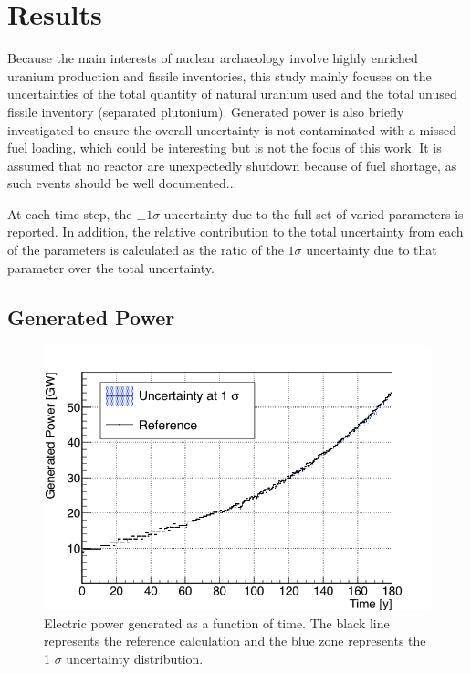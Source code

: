 \documentclass{anstrans}
\begin{document}
\section{Results}

Because the main interests of nuclear archaeology involve highly enriched uranium production and
fissile inventories, this study mainly focuses on the uncertainties of
the total quantity of natural uranium used and the total unused fissile
inventory (separated plutonium).
Generated power is also briefly investigated to ensure the overall
uncertainty is not contaminated with a missed fuel loading, which could
be interesting but is not the focus of this work. It is assumed that no reactor
are unexpectedly shutdown because of fuel shortage, as such events should be well
documented...

At each time step, the $\pm1\sigma$ uncertainty due to the full set of varied
parameters is reported.  In addition, the relative contribution to the total
uncertainty from each of the parameters is calculated as the ratio of the
$1\sigma$ uncertainty due to that parameter over the total uncertainty.

\subsection{Generated Power}

\begin{figure}[t] %
    \centering
    \includegraphics[scale=0.36]{power_full}
    \caption{Electric power generated as a function of time.  The black line
        represents the reference calculation and the blue zone
        represents the 1 $\sigma$ uncertainty distribution.}\label{fig:power_full}
\end{figure}
\end{document}
